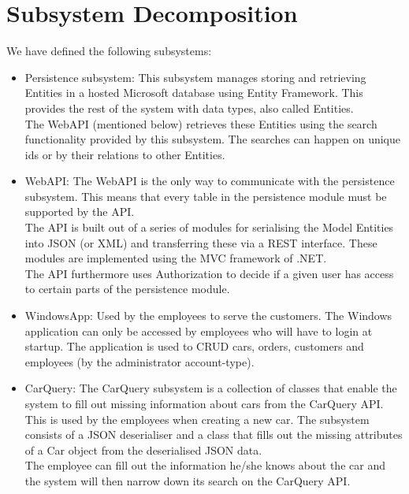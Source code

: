 \section{Subsystem Decomposition}
We have defined the following subsystems:
\begin{itemize}
	\item Persistence subsystem: This subsystem manages storing and retrieving Entities in a hosted Microsoft database using Entity Framework. This provides the rest of the system with data types, also called Entities. \\
	The WebAPI (mentioned below) retrieves these Entities using the search functionality provided by this subsystem. The searches can happen on unique ids or by their relations to other Entities. 
	\item WebAPI: The WebAPI is the only way to communicate with the persistence subsystem. This means that every table in the persistence module must be supported by the API. \\
	The API is built out of a series of modules for serialising the Model Entities into JSON (or XML) and transferring these via a REST interface. These modules are implemented using the MVC framework of .NET. \\
	The API furthermore uses Authorization to decide if a given user has access to certain parts of the persistence module.
	\item WindowsApp: Used by the employees to serve the customers. The Windows application can only be accessed by employees who will have to login at startup. The application is used to CRUD cars, orders, customers and employees (by the administrator account-type).
	\item CarQuery: The CarQuery subsystem is a collection of classes that enable the system to fill out missing information about cars from the CarQuery API. \\
	This is used by the employees when creating a new car. The subsystem consists of a JSON deserialiser and a class that fills out the missing attributes of a Car object from the deserialised JSON data. \\
	The employee can fill out the information he/she knows about the car and the system will then narrow down its search on the CarQuery API. 
\end{itemize}